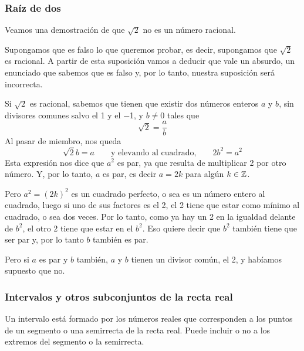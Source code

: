 \documentclass[../Teoría.root.tex]{subfiles}
\begin{document}
\subsubsection{Raíz de dos}
Veamos una demostración de que \(\sqrt{2}\) no es un número racional.

Supongamos que es falso lo que queremos probar, es decir, supongamos que \(\sqrt{2}\) es racional.
A partir de esta suposición vamos a deducir que vale un absurdo, un enunciado que sabemos que es falso y, por lo tanto, nuestra suposición será incorrecta.

Si \(\sqrt{2}\) es racional, sabemos que tienen que existir dos números enteros \(a\) y \(b\), sin divisores comunes salvo el 1 y el −1, y \(b \neq 0\) tales que \[\sqrt{2}=\frac{a}{b}\] Al pasar de miembro, nos queda
\[\sqrt{2}b=a\qquad\text{y elevando al cuadrado,}\qquad 2b^2=a^2\]
Esta expresión nos dice que \(a^2\) es par, ya que resulta de multiplicar 2 por otro número.
Y, por lo tanto, \(a\) es par, es decir \(a = 2k\) para algún \(k \in \mathbb{Z}\).

Pero \(a^2 = (2k)^2\) es un cuadrado perfecto, o sea es un número entero al cuadrado, luego si uno de sus factores es el 2, el 2 tiene que estar como mínimo al cuadrado, o sea dos veces.
Por lo tanto, como ya hay un 2 en la igualdad delante de \(b^2\), el otro 2 tiene que estar en el \(b^2\).
Eso quiere decir que \(b^2\) también tiene que ser par y, por lo tanto \(b\) también es par.

Pero si \(a\) es par y \(b\) también, \(a\) y \(b\) tienen un divisor común, el 2, y habíamos supuesto que no.
\subsubsection{Intervalos y otros subconjuntos de la recta real}
Un intervalo está formado por los números reales que corresponden a los puntos de un segmento o una semirrecta de la recta real.
Puede incluir o no a los extremos del segmento o la semirrecta.
\end{document}
